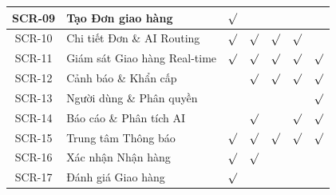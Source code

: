 \begin{table}[H]
{\begin{tabular}{|c|p{5.0cm}|c|c|c|c|c|}
SCR-09
&
Tạo Đơn giao hàng
&
$\surd$
&
&
&
&
\\
\hline

SCR-10
&
Chi tiết Đơn \& AI Routing
&
$\surd$
&
$\surd$
&
$\surd$
&
$\surd$
&
\\
\hline

SCR-11
&
Giám sát Giao hàng Real-time
&
$\surd$
&
$\surd$
&
$\surd$
&
$\surd$
&
$\surd$
\\
\hline

SCR-12
&
Cảnh báo \& Khẩn cấp
&
&
$\surd$
&
$\surd$
&
$\surd$
&
$\surd$
\\
\hline

SCR-13
&
Người dùng \& Phân quyền
&
&
&
&
&
$\surd$
\\
\hline

SCR-14
&
Báo cáo \& Phân tích AI
&
&
$\surd$
&
&
$\surd$
&
$\surd$
\\
\hline

SCR-15
&
Trung tâm Thông báo
&
$\surd$
&
$\surd$
&
$\surd$
&
$\surd$
&
$\surd$
\\
\hline

SCR-16
&
Xác nhận Nhận hàng
&
$\surd$
&
$\surd$
&
&
&
\\
\hline

SCR-17
&
Đánh giá Giao hàng
&
$\surd$
&
&
&
&
\\
\hline

\end{tabular}%
}

\end{table}
